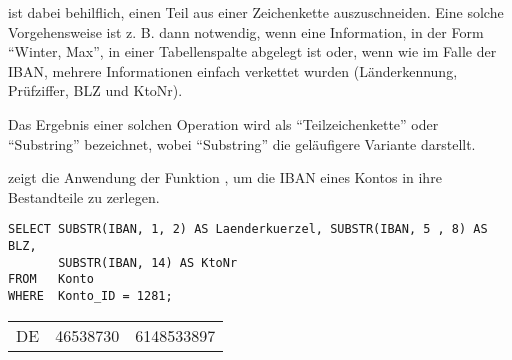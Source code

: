            ist dabei behilflich, einen Teil aus einer
          Zeichenkette auszuschneiden. Eine solche Vorgehensweise ist
          z. B. dann notwendig, wenn eine Information, in der Form
          \enquote{Winter, Max}, in einer Tabellenspalte abgelegt ist oder,
          wenn wie im Falle der IBAN, mehrere Informationen einfach verkettet
          wurden (L\"anderkennung, Pr\"ufziffer, BLZ und KtoNr).
          \begin{merke}
            Das Ergebnis einer solchen Operation wird als
            \enquote{Teilzeichenkette} oder \enquote{Substring} bezeichnet,
            wobei \enquote{Substring} die gel\"aufigere Variante darstellt.
          \end{merke}
           zeigt die Anwendung der Funktion
          , um die IBAN eines Kontos in ihre
          Bestandteile zu zerlegen.
          \begin{lstlisting}[language=oracle_sql,caption={Die Anwendung der Funktion \languageorasql{SUBSTR}},label=sql03_05]
SELECT SUBSTR(IBAN, 1, 2) AS Laenderkuerzel, SUBSTR(IBAN, 5 , 8) AS BLZ,
       SUBSTR(IBAN, 14) AS KtoNr
FROM   Konto
WHERE  Konto_ID = 1281;
          \end{lstlisting}
          \begin{center}
            \begin{small}
              \tablehead{}
              \begin{oraclesql}
                \begin{supertabular}{lrr}
                  DE & 46538730 & 6148533897 \\
                \end{supertabular}
              \end{oraclesql}
            \end{small}
          \end{center}
